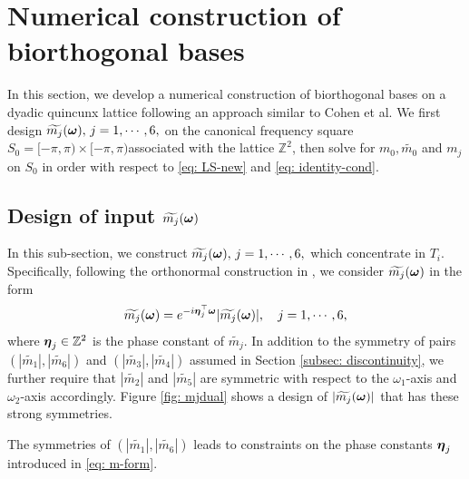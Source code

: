 \section{Numerical construction of biorthogonal bases}\label{sec: solve-quincunx}
In this section, we develop a numerical construction of biorthogonal bases on a dyadic quincunx lattice following an approach similar to Cohen et al. We first design $\widetilde{m_{j}}(\boldsymbol{\omega}),\,j = 1,\cdots,6,$ on the canonical frequency square $S_0 = [-\pi,\pi)\times[-\pi,\pi)$associated with the lattice $\mathbb{Z}^2$, then solve for $m_0,\widetilde{m_0}$ and $m_j$ on $S_0$ in order with respect to \eqref{eq: LS-new} and \eqref{eq: identity-cond}.

\subsection{Design of input $\widetilde{m_{j}}(\boldsymbol{\omega})$}\label{sec: phase-design}
In this sub-section, we construct $\widetilde{m_{j}}(\boldsymbol{\omega}),\, j = 1,\cdots,6,$ which concentrate in $T_i$.
Specifically, following the orthonormal construction in \cite{yin2014orthshear}, we consider $\widetilde{m_{j}}(\boldsymbol{\omega})$ in the form 
\begin{align}\label{eq: m-form}
\widetilde{m_{j}}(\boldsymbol{\omega}) = e^{-i\boldsymbol{\eta}_j^\top\boldsymbol{\omega}}|\widetilde{m_{j}}(\boldsymbol{\omega})|,\quad j = 1,\cdots,6,
\end{align}
where $\boldsymbol{\eta}_j\in\mathbb{Z}^2$ is the phase constant of $\widetilde{m_j}$. In addition to the symmetry of pairs $(|\widetilde{m_1}|, |\widetilde{m_6}|)$ and $(|\widetilde{m_3}|, |\widetilde{m_4}|)$ assumed in Section \ref{subsec: discontinuity}, we further require that $|\widetilde{m_2}|$ and $|\widetilde{m_5}|$ are symmetric with respect to the $\omega_1$-axis and $\omega_2$-axis accordingly.
Figure \ref{fig: mjdual} shows a design of $|\widetilde{m_{j}}(\boldsymbol{\omega})|$ that has these strong symmetries.
 
The symmetries of $(|\widetilde{m_1}|, |\widetilde{m_6}|)$ leads to constraints on the phase constants $\boldsymbol{\eta}_j$ introduced in \eqref{eq: m-form}.
 
